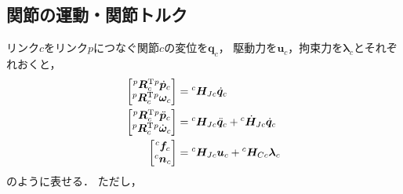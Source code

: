 ﻿\documentclass[a4paper]{jsarticle}
\begin{document}
\subsection{関節の運動・関節トルク}

リンク$c$をリンク$p$につなぐ関節$c$の変位を$\bm{q}_{c}$，
駆動力を$\bm{u}_{c}$，拘束力を$\bm{\lambda}_{c}$とそれぞれおくと，
\begin{align}
\left[\begin{array}{@{}c@{}}
  {}^{p}\bm{R}_{c}^{\mathrm{T}}{}^{p}\dot{\bm{p}}_{c} \\
  {}^{p}\bm{R}_{c}^{\mathrm{T}}{}^{p}\bm{\omega}_{c}
 \end{array}\right]
 &={}^{c}\bm{H}_{Jc}\dot{\bm{q}}_{c} \\
\left[\begin{array}{@{}c@{}}
  {}^{p}\bm{R}_{c}^{\mathrm{T}}{}^{p}\ddot{\bm{p}}_{c} \\
  {}^{p}\bm{R}_{c}^{\mathrm{T}}{}^{p}\dot{\bm{\omega}}_{c}
 \end{array}\right]
 &={}^{c}\bm{H}_{Jc}\ddot{\bm{q}}_{c}+{}^{c}\dot{\bm{H}}_{Jc}\dot{\bm{q}}_{c} \\
\left[\begin{array}{@{}c@{}}
  {}^{c}\bm{f}_{c} \\ {}^{c}\bm{n}_{c}
 \end{array}\right]
 &={}^{c}\bm{H}_{Jc}\bm{u}_{c}+{}^{c}\bm{H}_{Cc}\bm{\lambda}_{c}
 \label{eq:j_force}
\end{align}
のように表せる．
ただし，
\end{document}
